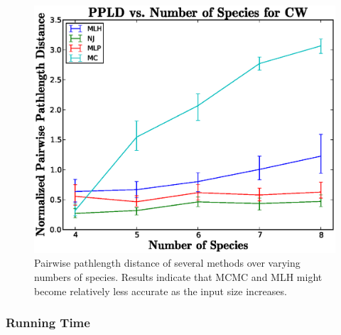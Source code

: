 \documentclass[10pt,twocolumn]{article}
\begin{document}
\begin{figure}[ht!]
\begin{centering}
  \includegraphics[scale=.45]{media/accGraphs/CWacc.eps}
  \caption{Pairwise pathlength distance of several methods over varying numbers of species. Results indicate that MCMC and MLH might become relatively less accurate as the input size increases.}
  \label{accuracynumspec}
\end{centering}
\end{figure}
\subsubsection*{Running Time}
\end{document}
